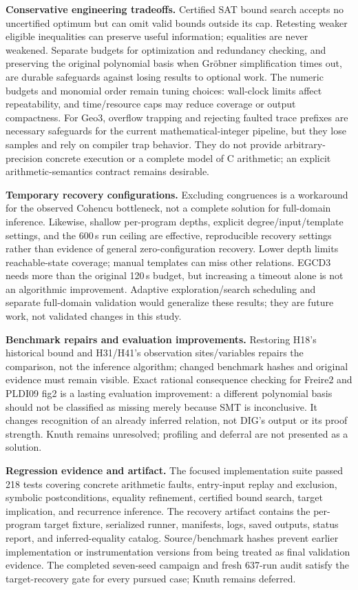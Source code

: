 \documentclass[runningheads]{llncs}
\begin{document}
\medskip\noindent\textbf{Conservative engineering tradeoffs.}
Certified SAT bound search accepts no uncertified optimum but can omit valid bounds outside its cap.  Retesting weaker eligible inequalities can preserve useful information; equalities are never weakened.  Separate budgets for optimization and redundancy checking, and preserving the original polynomial basis when Gr\"obner simplification times out, are durable safeguards against losing results to optional work.  The numeric budgets and monomial order remain tuning choices: wall-clock limits affect repeatability, and time/resource caps may reduce coverage or output compactness.  For Geo3, overflow trapping and rejecting faulted trace prefixes are necessary safeguards for the current mathematical-integer pipeline, but they lose samples and rely on compiler trap behavior.  They do not provide arbitrary-precision concrete execution or a complete model of C arithmetic; an explicit arithmetic-semantics contract remains desirable.

\medskip\noindent\textbf{Temporary recovery configurations.}
Excluding congruences is a workaround for the observed Cohencu bottleneck, not a complete solution for full-domain inference.  Likewise, shallow per-program depths, explicit degree/input/template settings, and the 600\,s run ceiling are effective, reproducible recovery settings rather than evidence of general zero-configuration recovery.  Lower depth limits reachable-state coverage; manual templates can miss other relations.  EGCD3 needs more than the original 120\,s budget, but increasing a timeout alone is not an algorithmic improvement.  Adaptive exploration/search scheduling and separate full-domain validation would generalize these results; they are future work, not validated changes in this study.

\medskip\noindent\textbf{Benchmark repairs and evaluation improvements.}
Restoring H18's historical bound and H31/H41's observation sites/variables repairs the comparison, not the inference algorithm; changed benchmark hashes and original evidence must remain visible.  Exact rational consequence checking for Freire2 and PLDI09 fig2 is a lasting evaluation improvement: a different polynomial basis should not be classified as missing merely because SMT is inconclusive.  It changes recognition of an already inferred relation, not DIG's output or its proof strength.  Knuth remains unresolved; profiling and deferral are not presented as a solution.

\medskip\noindent\textbf{Regression evidence and artifact.}
The focused implementation suite passed 218 tests covering concrete arithmetic faults, entry-input replay and exclusion, symbolic postconditions, equality refinement, certified bound search, target implication, and recurrence inference.  The recovery artifact contains the per-program target fixture, serialized runner, manifests, logs, saved outputs, status report, and inferred-equality catalog.  Source/benchmark hashes prevent earlier implementation or instrumentation versions from being treated as final validation evidence.  The completed seven-seed campaign and fresh 637-run audit satisfy the target-recovery gate for every pursued case; Knuth remains deferred.
\end{document}
